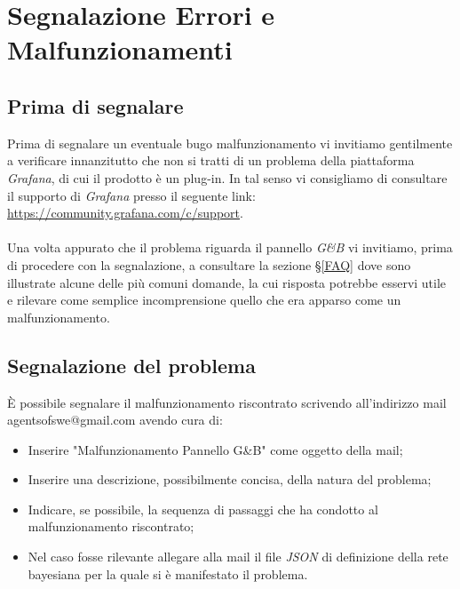 \section{Segnalazione Errori e Malfunzionamenti}\label{Segnalazione}

\subsection{Prima di segnalare}\label{BeforeReport}
Prima di segnalare un eventuale bug\glossario o malfunzionamento vi invitiamo gentilmente a verificare innanzitutto che non si tratti di un problema della piattaforma \textit{Grafana}, di cui il prodotto è un plug-in. In tal senso vi consigliamo di consultare il supporto di \textit{Grafana} presso il seguente link: \url{https://community.grafana.com/c/support}.\\
~\\
Una volta appurato che il problema riguarda il pannello \textit{G\&B} vi invitiamo, prima di procedere con la segnalazione, a consultare la sezione §\ref{FAQ} dove sono illustrate alcune delle più comuni domande, la cui risposta potrebbe esservi utile e rilevare come semplice incomprensione quello che era apparso come un malfunzionamento.

\subsection{Segnalazione del problema}\label{Report}
È possibile segnalare il malfunzionamento riscontrato scrivendo all'indirizzo mail agentsofswe@gmail.com avendo cura di:
\begin{itemize}
	\item Inserire "Malfunzionamento Pannello G\&B" come oggetto della mail;
	\item Inserire una descrizione, possibilmente concisa, della natura del problema;
	\item Indicare, se possibile, la sequenza di passaggi che ha condotto al malfunzionamento riscontrato;
	\item Nel caso fosse rilevante allegare alla mail il file \textit{JSON} di definizione della rete bayesiana per la quale si è manifestato il problema.
\end{itemize}
